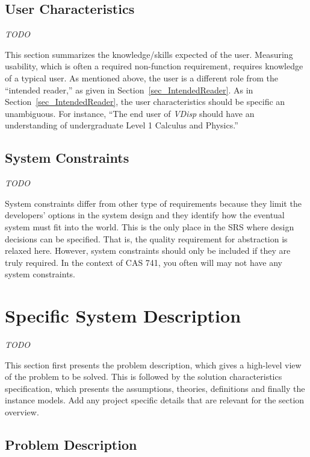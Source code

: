 \documentclass[12pt]{article}
\begin{document}
\subsection{User Characteristics} \label{SecUserCharacteristics}

\emph{TODO}

This section summarizes the knowledge/skills expected of the user. Measuring
usability, which is often a required non-function requirement, requires
knowledge of a typical user.  As mentioned above, the user is a different role
from the ``intended reader,'' as given in Section~\ref{sec_IntendedReader}.  As
in Section~\ref{sec_IntendedReader}, the user characteristics should be specific
an unambiguous. For instance, ``The end user of \emph{VDisp}{} should have an
understanding of undergraduate Level 1 Calculus and Physics.''

\subsection{System Constraints}

\emph{TODO}

System constraints differ from other type of requirements because they limit the
developers’ options in the system design and they identify how the eventual
system must fit into the world. This is the only place in the SRS where design
decisions can be specified.  That is, the quality requirement for abstraction is
relaxed here.  However, system constraints should only be included if they are
truly required. In the context of CAS 741, you often will may not have any
system constraints.

\section{Specific System Description}

\emph{TODO}

This section first presents the problem description, which gives a high-level
view of the problem to be solved.  This is followed by the solution characteristics
specification, which presents the assumptions, theories, definitions and finally
the instance models.  Add any project specific details that are relevant
for the section overview.

\subsection{Problem Description} \label{Sec_pd}
\end{document}
